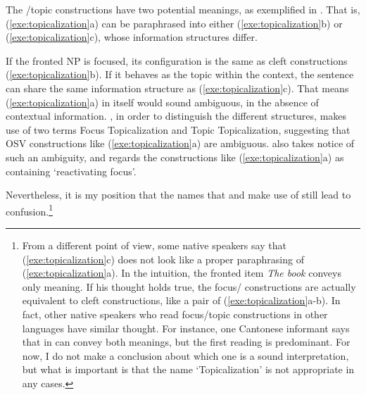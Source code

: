 The /topic  constructions have two potential meanings, as
exemplified in . That is,
(\ref{exe:topicalization}a) can be paraphrased into either
(\ref{exe:topicalization}b) or (\ref{exe:topicalization}c), whose
information structures differ.




\noindent If the fronted NP is focused, its configuration is the same
as cleft constructions (\ref{exe:topicalization}b). If it behaves as
the topic within the context, the sentence can share the same
information structure as (\ref{exe:topicalization}c).  That means
(\ref{exe:topicalization}a) in itself would sound ambiguous, in the
absence of contextual information.  \citet{gundel:83}, in order to
distinguish the different structures, makes use of two terms Focus
Topicalization and Topic Topicalization, suggesting that OSV
constructions like (\ref{exe:topicalization}a) are
ambiguous. \citet{gussenhoven:07} also takes notice of such an
ambiguity, and regards the constructions like
(\ref{exe:topicalization}a) as containing `reactivating focus'.







\noindent Nevertheless, it is my position that the names that
\citeauthor{gundel:83} and \citeauthor{gussenhoven:07} make use of
still lead to confusion.\footnote{From a different point of view, some
   native speakers say that (\ref{exe:topicalization}c) does
  not look like a proper paraphrasing of
  (\ref{exe:topicalization}a). In the intuition, the
  fronted item \textit{The book} conveys only  meaning.  If his
  thought holds true, the focus/  constructions are
  actually equivalent to cleft constructions, like a pair of
  (\ref{exe:topicalization}a-b).  In fact, other native speakers who
  read focus/topic constructions in other languages have similar
  thought. For instance, one Cantonese informant says that
   in  can convey both
  meanings, but the first reading is predominant.  For now, I do not
  make a conclusion about which one is a sound interpretation, but
  what is important is that the name `Topicalization' is not
  appropriate in any cases.}


